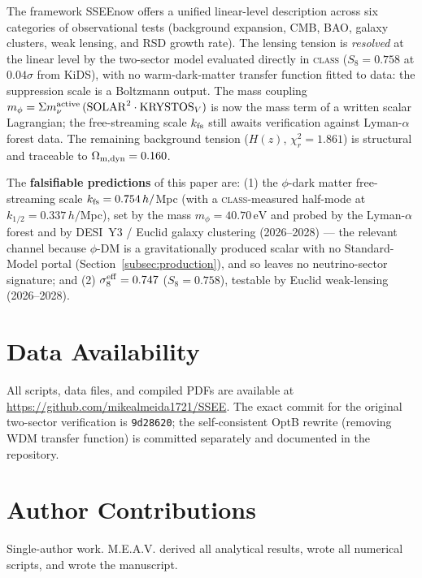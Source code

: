 \documentclass[12pt,a4paper]{article}
\newcommand{\SSEE}{\textsc{SSEE}}
\newcommand{\phiDM}{\phi\text{-DM}}
\newcommand{\kfs}{k_{\rm fs}}
\newcommand{\mphi}{m_\phi}
\newcommand{\sigeff}{\sigma_8^{\rm eff}}
\begin{document}
The framework \SSEE now offers a unified linear-level description across six categories of observational tests
(background expansion, CMB, BAO, galaxy clusters, weak lensing, and RSD growth
rate). The lensing tension is \emph{resolved} at the linear level by the
two-sector model evaluated directly in \textsc{class} ($S_8 = 0.758$ at
$0.04\sigma$ from KiDS), with no warm-dark-matter transfer function fitted to
data: the suppression scale is a Boltzmann output. The mass coupling
$m_\phi = \Sigma m_\nu^{\rm active}\,(\mathrm{SOLAR}^2\cdot\mathrm{KRYSTOS}_V)$ is
now the mass term of a written scalar Lagrangian; the free-streaming scale
$k_{\rm fs}$ still awaits verification against Lyman-$\alpha$ forest data. The
remaining background tension ($H(z)$, $\chi^2_r = 1.861$) is structural and
traceable to $\Omega_{\rm m,dyn} = 0.160$.

The \textbf{falsifiable predictions} of this paper are: (1) the $\phi$-dark
matter free-streaming scale $\kfs = 0.754\,h/$Mpc (with a \textsc{class}-measured
half-mode at $k_{1/2} = 0.337\,h/$Mpc), set by the mass
$\mphi = 40.70\,\mathrm{eV}$ and probed by the Lyman-$\alpha$ forest and by
DESI~Y3 / Euclid galaxy clustering (2026--2028) --- the relevant channel
because $\phiDM$ is a gravitationally produced scalar with no Standard-Model
portal (Section~\ref{subsec:production}), and so leaves no neutrino-sector
signature; and (2) $\sigeff = 0.747$ ($S_8 = 0.758$), testable by Euclid
weak-lensing (2026--2028).

\section*{Data Availability}

All scripts, data files, and compiled PDFs are available at
\url{https://github.com/mikealmeida1721/SSEE}.
The exact commit for the original two-sector verification is \texttt{9d28620};
the self-consistent OptB rewrite (removing WDM transfer function) is committed
separately and documented in the repository.

\section*{Author Contributions}

Single-author work. M.E.A.V. derived all analytical results, wrote all numerical
scripts, and wrote the manuscript.

\clearpage


\end{document}
